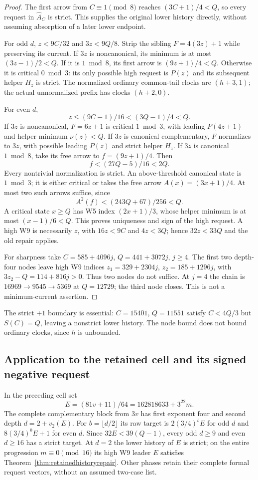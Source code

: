 \documentclass[11pt]{article}
\begin{document}
\begin{proof}
The first arrow from $C\equiv1\pmod8$ reaches $(3C+1)/4<Q$,
so every request in $\widehat A_C$ is strict. This supplies the
original lower history directly, without assuming absorption of a
later lower endpoint.

For odd $d$, $z<9C/32$ and $3z<9Q/8$. Strip the sibling
$F=4(3z)+1$ while preserving its current. If $3z$ is noncanonical,
its minimum is at most $(3z-1)/2<Q$. If it is $1\bmod8$, its
first arrow is $(9z+1)/4<Q$. Otherwise it is critical $0\bmod3$:
its only possible high request is $P(z)$ and its subsequent helper
$H_z$ is strict. The normalized ordinary common-tail clocks are
$(h+3,1)$; the actual unnormalized prefix has clocks $(h+2,0)$.

For even $d$,
\[
 z\le(9C-1)/16<(3Q-1)/4<Q.
\]
If $3z$ is noncanonical, $F=6z+1$ is critical $1\bmod3$,
with leading $P(4z+1)$ and helper minimum $\nu(z)<Q$.
If $3z$ is canonical complementary, $F$ normalizes to $3z$,
with possible leading $P(z)$ and strict helper $H_z$.
If $3z$ is canonical $1\bmod8$, take its free arrow to
$f=(9z+1)/4$. Then
\[
 f<(27Q-5)/16<2Q.
\]
Every nontrivial normalization is strict. An above-threshold canonical
state is $1\bmod3$; it is either critical or takes the free arrow
$A(x)=(3x+1)/4$. At most two such arrows suffice, since
\[
 A^2(f)<(243Q+67)/256<Q.
\]
A critical state $x\ge Q$ has W5 index $(2x+1)/3$, whose helper
minimum is at most $(x-1)/6<Q$. This proves uniqueness and sign of
the high request. A high W9 is necessarily $z$, with
$16z<9C$ and $4z<3Q$; hence $32z<33Q$ and the old repair applies.

For sharpness take $C=585+4096j$, $Q=441+3072j$, $j\ge4$.
The first two depth-four nodes leave high W9 indices
$z_1=329+2304j$, $z_2=185+1296j$, with
$3z_2-Q=114+816j>0$. Thus two nodes do not suffice.
At $j=4$ the chain is $16969\to9545\to5369$ at $Q=12729$;
the third node closes. This is not a minimum-current assertion.
\end{proof}

The strict $+1$ boundary is essential: $C=15401$, $Q=11551$
satisfy $C<4Q/3$ but $S(C)=Q$, leaving a nonstrict lower history.
The node bound does not bound ordinary clocks, since $h$ is unbounded.

\subsection*{Application to the retained cell and its signed negative request}
In the preceding cell set
\[
 E=(81v+11)/64=162818633+3^{22}m.
\]
The complete complementary block from $3v$ has first exponent four
and second depth $d=2+v_2(E)$. For $b=\lfloor d/2\rfloor$ its raw
target is $2(3/4)^bE$ for odd $d$ and $8(3/4)^bE+1$ for even $d$.
Since $32E<39(Q-1)$, every odd $d\ge9$ and even $d\ge16$ has a
strict target. At $d=2$ the lower history of $E$ is strict; on the
entire progression $m\equiv0\pmod{16}$ its high W9 leader $E$
satisfies Theorem~\ref{thm:retainedhistoryrepair}. Other phases retain
their complete formal request vectors, without an assumed two-case list.
\end{document}
